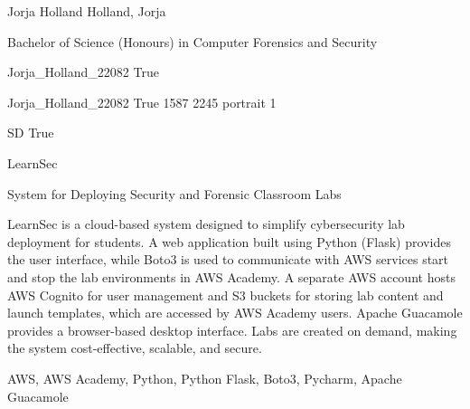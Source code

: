 \documentclass[twoside]{report}
\begin{document}
\begingroup{}\relax



\def\Key{Jorja_Holland_22082}

{Jorja Holland}
{Holland, Jorja}

{Bachelor of Science (Honours) in Computer Forensics and Security}

{Jorja_Holland_22082}
{True}

{Jorja_Holland_22082}
{True}
{1587}
{2245}
{portrait}
{1}

{SD}
{True}

{LearnSec}

{System for Deploying Security and Forensic Classroom Labs}

{LearnSec is a cloud-based system designed to simplify cybersecurity lab deployment for students. A web application built using Python (Flask) provides the user interface, while Boto3 is used to communicate with AWS services start and stop the lab environments in AWS Academy. A separate AWS account hosts AWS Cognito for user management and S3 buckets for storing lab content and launch templates, which are accessed by AWS Academy users. Apache Guacamole provides a browser-based desktop interface. Labs are created on demand, making the system cost-effective, scalable, and secure.}

{AWS, AWS Academy, Python, Python Flask, Boto3, Pycharm, Apache Guacamole}
\end{document}

